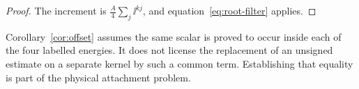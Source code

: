 \begin{proof}
The increment is $\frac A4\sum_j\ii^{kj}$, and
equation~\eqref{eq:root-filter} applies.
\end{proof}

\begin{remark}
Corollary~\ref{cor:offset} assumes the same scalar is proved to occur inside
each of the four labelled energies.  It does not license the replacement of
an unsigned estimate on a separate kernel by such a common term.  Establishing
that equality is part of the physical attachment problem.
\end{remark}
